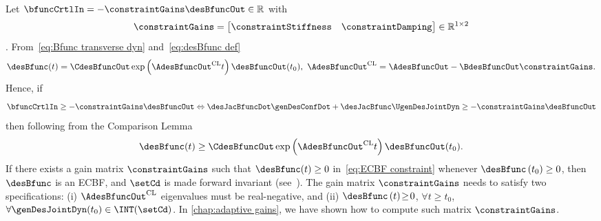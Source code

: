 Let $\bfuncCrtlIn = -\constraintGains \desBfuncOut\in\mathbb{R}$ with 
\begin{equation}\label{eq:ECBF gains}
	\constraintGains = \begin{bmatrix}
		\constraintStiffness & \constraintDamping
	\end{bmatrix}\in\mathbb{R}^{1\times2}
\end{equation}. From~\cref{eq:Bfunc transverse dyn} and~\cref{eq:desBfunc def}
\begin{equation}\label{eq:ECBF comparison lemma}
	\desBfunc(t) =  \CdesBfuncOut \exp\left({\AdesBfuncOut^{\text{CL}}t}\right)\desBfuncOut(t_0), \ \AdesBfuncOut^{\text{CL}} =\AdesBfuncOut-\BdesBfuncOut \constraintGains.
\end{equation} 
Hence, if 
\begin{equation}
	\bfuncCrtlIn \geq -\constraintGains \desBfuncOut \Leftrightarrow  \desJacBfuncDot\genDesConfDot + \desJacBfunc \UgenDesJointDyn \geq -\constraintGains\desBfuncOut
\end{equation}
then following from the  Comparison Lemma~\cite[Lemma~3.4]{khalil2002NonLinearSystems}
\begin{equation}\label{eq:ECBF constraint}
	\desBfunc(t) \geq  \CdesBfuncOut \exp\left({\AdesBfuncOut^{\text{CL}}t}\right)\desBfuncOut(t_0).
\end{equation} 
If there exists a gain matrix $\constraintGains$ such that $\desBfunc(t)\geq0$ in~\cref{eq:ECBF constraint} whenever $\desBfunc\left(t_0\right)\geq0$, then $\desBfunc$ is an ECBF, and $\setCd$ is made forward invariant (see~\cite[Definition~7]{ames2019ecc}). The gain matrix $\constraintGains$ needs to satisfy two specifications: (i) $\AdesBfuncOut^{\text{CL}}$ eigenvalues must be real-negative, %
and (ii) $\desBfunc\left(t\right)\!\geq\!0$, $\forall t \!\geq \! t_0$, $\forall \genDesJointDyn(t_0)\in\INT(\setCd)$. In \cref{chap:adaptive gains}, we have shown how to compute such matrix $\constraintGains$. 

